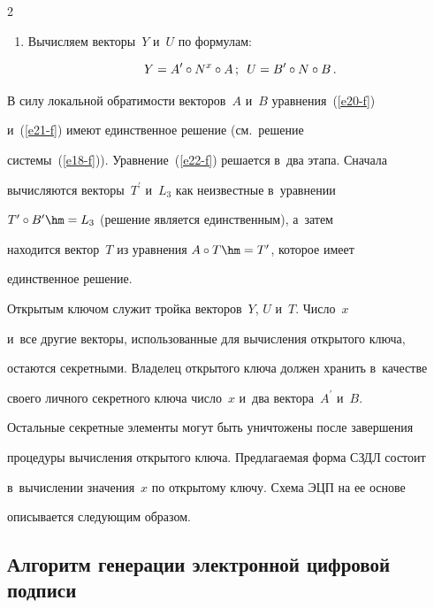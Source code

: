 \begin{multicols}{2}
\begin{enumerate}[1.]
  \item Вычисляем векторы~$Y$ и~$U$ по формулам:


  $$


  Y=A^\prime \circ N^x\circ A\,;\enskip U=B^\prime\circ N\circ B\,.


  $$


  \end{enumerate}


  


  В силу локальной обратимости векторов~$A$ и~$B$ уравнения~(\ref{e20-f}) 


и~(\ref{e21-f}) имеют единственное решение (см.\ решение  


системы~(\ref{e18-f})). Уравнение~(\ref{e22-f}) решается в~два этапа. Сначала 


вычисляются векторы~$T^\prime$ и~$L_3$ как неизвестные в~уравнении 


$T^\prime\circ B^\prime \hm=L_3$ (решение является единственным), а~затем 


находится вектор~$T$ из уравнения $A\circ T\hm= T^\prime$, которое имеет 


единственное решение.


  


  Открытым ключом служит тройка векторов~$Y$, $U$ и~$T$. Число~$x$ 


и~все другие векторы, использованные для вычисления открытого ключа, 


остаются секретными. Владелец открытого ключа должен хранить в~качестве 


своего личного секретного ключа число~$x$ и~два вектора~$A^\prime$ и~$B$. 


Остальные секретные элементы могут быть уничтожены после завершения 


процедуры вычисления открытого ключа. Предлагаемая форма СЗДЛ состоит 


в~вычислении значения~$x$ по открытому ключу. Схема ЭЦП на ее основе 


описывается следующим образом. 





  \vspace*{-6pt}


  


  \subsection*{Алгоритм генерации электронной цифровой подписи}



\end{multicols}
